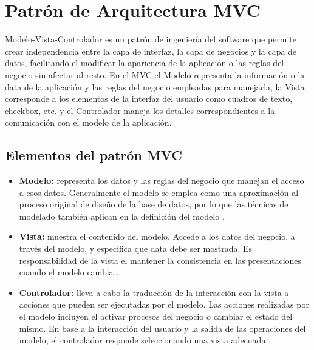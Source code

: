 \section{Patrón de Arquitectura MVC}
Modelo-Vista-Controlador es un patrón de ingeniería del software que permite crear independencia entre la capa de interfaz, la capa de negocios y la capa de datos, facilitando el modificar la apariencia de la aplicación o las reglas del negocio sin afectar al resto. En el MVC el Modelo representa la información o la data de la aplicación y las reglas del negocio empleadas para manejarla, la Vista corresponde a los elementos de la interfaz del usuario como cuadros de texto, checkbox, etc. y el Controlador maneja los detalles correspondientes a la comunicación con el modelo de la aplicación.

\subsection {Elementos del patrón MVC}

\begin{itemize}
	\item \textbf{Modelo:} representa los datos y las reglas del negocio que manejan el acceso a esos datos. Generalmente el modelo se emplea como una aproximación al proceso original de diseño de la base de datos, por lo que las técnicas de modelado también aplican en la definición del modelo \citep{MVC_Java2002}.
	\item \textbf{Vista:} muestra el contenido del modelo. Accede a los datos del negocio, a través del modelo, y especifica que data debe ser mostrada. Es responsabilidad de la vista el mantener la consistencia en las presentaciones cuando el modelo cambia \citep{MVC_Java2002}.
	\item \textbf{Controlador:} lleva a cabo la traducción de la interacción con la vista a acciones que pueden ser ejecutadas por el modelo. Las acciones realizadas por el modelo incluyen el activar procesos del negocio o cambiar el estado del mismo. En base a la interacción del usuario y la salida de las operaciones del modelo, el controlador responde seleccionando una vista adecuada \citep{MVC_Java2002}.
\end{itemize}

